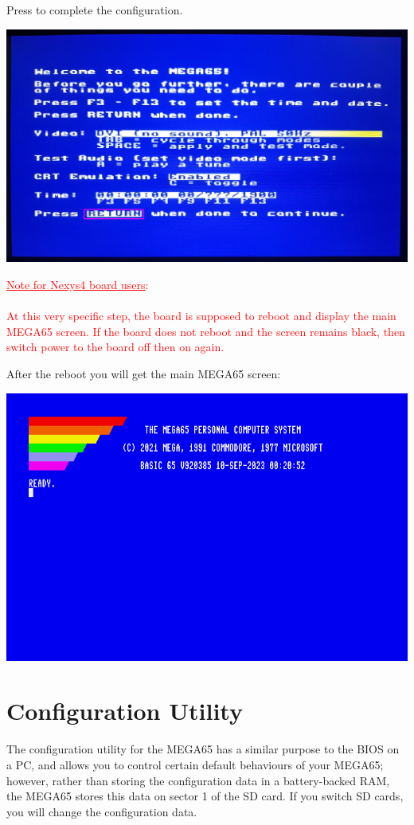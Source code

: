 Press  to complete the configuration.

\begin{center}
  \includegraphics[trim= 6mm 6mm 6mm 6mm,clip,width=0.7\linewidth]{images/img011_final_boot_05.png}
\end{center}

\ifdefined\printmanual
\else
\textcolor{red}{\underline{Note for Nexys4 board users}: \\
\\
  At this very specific step, the board is supposed to reboot and display the main MEGA65 screen. If the board does not reboot and the screen remains black, then switch power to the board off then on again.}
\fi

After the reboot you will get the main MEGA65 screen:

\begin{center}
  \includegraphics[trim=0 2cm 0 0,clip,width=0.7\linewidth]{images/img011_final_boot_06.png}
\end{center}

\section{Configuration Utility}
\label{sec:configuration-utility}

The configuration utility for the MEGA65 has a similar purpose to the BIOS on a PC, and allows you to control certain default behaviours of your MEGA65; however, rather than storing the configuration data in a
battery-backed RAM, the MEGA65 stores this data on sector 1 of the SD card. If you switch SD cards, you will change the configuration data.

